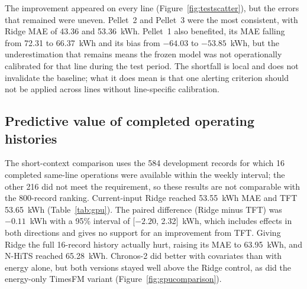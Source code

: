 The improvement appeared on every line (Figure~\ref{fig:testscatter}), but the errors that remained were uneven. Pellet~2 and Pellet~3 were the most consistent, with Ridge MAE of 43.36 and 53.36~kWh. Pellet~1 also benefited, its MAE falling from 72.31 to 66.37~kWh and its bias from $-64.03$ to $-53.85$~kWh, but the underestimation that remains means the frozen model was not operationally calibrated for that line during the test period. The shortfall is local and does not invalidate the baseline; what it does mean is that one alerting criterion should not be applied across lines without line-specific calibration.


\FloatBarrier
\subsection{Predictive value of completed operating histories}
The short-context comparison uses the 584 development records for which 16 completed same-line operations were available within the weekly interval; the other 216 did not meet the requirement, so these results are not comparable with the 800-record ranking. Current-input Ridge reached 53.55~kWh MAE and TFT 53.65~kWh (Table~\ref{tab:gpu}). The paired difference (Ridge minus TFT) was $-0.11$~kWh with a 95\% interval of [$-2.20$, 2.32]~kWh, which includes effects in both directions and gives no support for an improvement from TFT. Giving Ridge the full 16-record history actually hurt, raising its MAE to 63.95~kWh, and N-HiTS reached 65.28~kWh. Chronos-2 did better with covariates than with energy alone, but both versions stayed well above the Ridge control, as did the energy-only TimesFM variant (Figure~\ref{fig:gpucomparison}).

